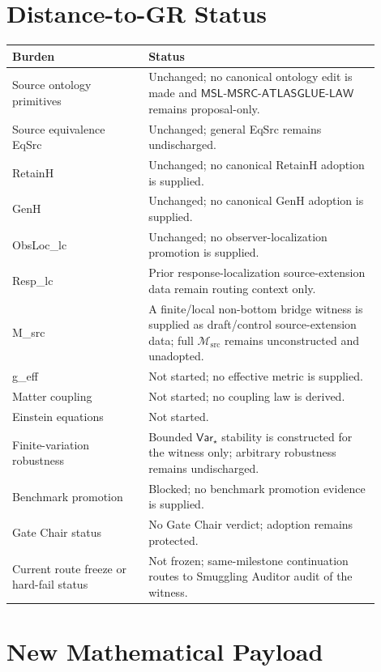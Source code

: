 \documentclass[11pt]{article}
\newcommand{\Msrc}{\mathcal{M}_{\mathrm{src}}}
\newcommand{\MSL}{\mathsf{MSL}\mbox{-}\mathsf{MSRC}\mbox{-}\mathsf{ATLASGLUE}\mbox{-}\mathsf{LAW}}
\newcommand{\Varstar}{\mathsf{Var}_{\star}}
\begin{document}
\section{Distance-to-GR Status}

\begin{center}
\begin{tabular}{p{0.33\linewidth}p{0.57\linewidth}}
\hline
Burden & Status \\
\hline
Source ontology primitives & Unchanged; no canonical ontology edit is made and \(\MSL\) remains proposal-only. \\
Source equivalence EqSrc & Unchanged; general EqSrc remains undischarged. \\
RetainH & Unchanged; no canonical RetainH adoption is supplied. \\
GenH & Unchanged; no canonical GenH adoption is supplied. \\
ObsLoc\_lc & Unchanged; no observer-localization promotion is supplied. \\
Resp\_lc & Prior response-localization source-extension data remain routing context only. \\
M\_src & A finite/local non-bottom bridge witness is supplied as draft/control source-extension data; full \(\Msrc\) remains unconstructed and unadopted. \\
g\_eff & Not started; no effective metric is supplied. \\
Matter coupling & Not started; no coupling law is derived. \\
Einstein equations & Not started. \\
Finite-variation robustness & Bounded \(\Varstar\) stability is constructed for the witness only; arbitrary robustness remains undischarged. \\
Benchmark promotion & Blocked; no benchmark promotion evidence is supplied. \\
Gate Chair status & No Gate Chair verdict; adoption remains protected. \\
Current route freeze or hard-fail status & Not frozen; same-milestone continuation routes to Smuggling Auditor audit of the witness. \\
\hline
\end{tabular}
\end{center}

\section{New Mathematical Payload}
\end{document}
